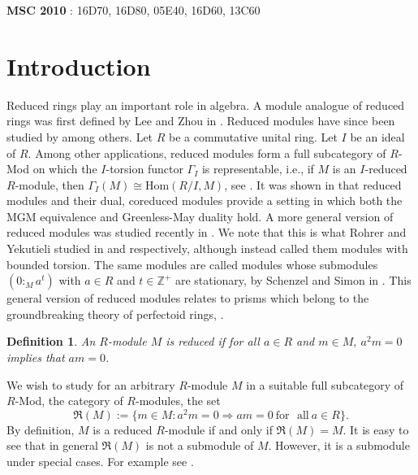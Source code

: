 \documentclass[12pt,a4paper]{article}
\newcommand{\noi}{\noindent}
\newtheorem{defn}{Definition}[section]
\begin{document}
		\vspace*{0.4cm}
		
		{\bf MSC 2010}  : 16D70, 16D80, 05E40, 16D60, 13C60
		\section{Introduction}
		\begin{paragraph}\noi
			Reduced rings play an important role in algebra. A module analogue of reduced rings was first defined by Lee and Zhou in \cite{lee2004reduced}. Reduced modules have since been studied by \cite{agayev2009reduced, kyomuhangi2020locally, rege2008reduced, ssevviiri2022applications} among others.
			Let $R$ be a commutative unital ring. Let $I$ be an ideal of $R$. Among other applications, reduced modules form a full subcategory of $R$-Mod on which the $I$-torsion functor $\Gamma_I$ is representable, i.e., if $M$ is an $I$-reduced $R$-module, then $\Gamma_I(M)\cong \text{Hom}(R/I, M)$, see \cite{ssevviiri2022applications}. It was shown in \cite{ssevviiri2022applications} that reduced modules and their dual, coreduced modules provide a setting in which both the MGM equivalence and Greenless-May duality hold. A more general version of reduced modules was studied recently in \cite{kyomuhangi2021generalised}. We note that this is what Rohrer and Yekutieli studied in \cite{rohrer2019torsion} and \cite{yekutieli2021weak} respectively, although instead called them modules with bounded torsion. The same modules are called modules whose submodules $(0:_M a^t)$ with $a \in R$ and $t\in \mathbb{Z}^+$ are stationary, by Schenzel and Simon in \cite[Proposition $3.1.10$]{schenzel2018completion}. This general version of reduced modules relates to prisms which belong to the groundbreaking theory of perfectoid rings, \cite{bhatt2019prisms, yekutieli2021weak}.
		\end{paragraph}
		\begin{defn}
			An $R$-module $M$ is {\it reduced} if for all $a\in R$ and $m\in M,~ a^2m=0$ implies that $am=0$.
		\end{defn}
		\begin{paragraph}\noi
			We wish to study for an arbitrary $R$-module $M$ in a suitable full  subcategory of $R$-Mod, the category of $R$-modules, the set
			\begin{equation}
				\mathfrak{R}(M):=\{m\in M: a^2m=0 \Rightarrow am=0 ~\text{for~~all}~ a\in R\}.
			\end{equation} By definition, $M$ is a reduced $R$-module if and only if $\mathfrak{R}(M)=M$. It is easy to see that in general $\mathfrak{R}(M)$ is not a submodule of $M$. However, it is a submodule under special cases. For example see \cite[Theorem 2.1]{ssevviiri2012structure}. 
		\end{paragraph}
\end{document}
